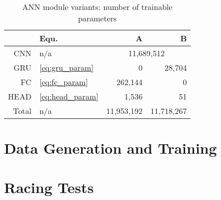 \begin{table}[h]
    \caption{ANN module variants: number of trainable parameters\label{tab:ann_module_variants_nparams}}
    \centering
    \begin{tabular}{|r|l|r|r|} \hline
            &Equ.& A & B\\\hline\hline
        CNN &n/a&\multicolumn{2}{|c|}{11,689,512}\\\hline
        GRU &\ref{eq:gru_param}&0&28,704\\\hline
        FC  &\ref{eq:fc_param}&262,144&0\\\hline
        HEAD&\ref{eq:head_param}&1,536&51\\\hline\hline
        Total&n/a&11,953,192&11,718,267\\\hline
    \end{tabular}
\end{table}

\section{Data Generation and Training}

\section{Racing Tests}
